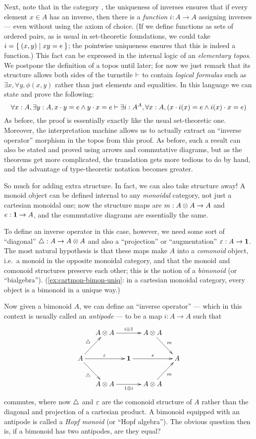 Next, note that in the category \bSet, the uniqueness of inverses ensures that if every element $x\in A$ has an inverse, then there is a \emph{function} $i:A\to A$ assigning inverses --- even without using the axiom of choice.
(If we define functions as sets of ordered pairs, as is usual in set-theoretic foundations, we could take $i = \Set{(x,y) | xy=e}$; the pointwise uniqueness ensures that this is indeed a function.)
This fact can be expressed in the internal logic of an \emph{elementary topos}.
We postpone the definition of a topos until later; for now we just remark that its structure allows both sides of the turnstile $\vdash$ to contain \emph{logical formulas} such as $\exists x, \forall y, \phi(x,y)$ rather than just elements and equalities.
In this language we can state and prove the following:
\[ \forall x:A, \exists y:A, x\cdot y = e \land y\cdot x = e \vdash
\exists i:A^A, \forall x:A, (x\cdot i(x) = e \land i(x)\cdot x = e)
\]
As before, the proof is essentially exactly like the usual set-theoretic one.
Moreover, the interpretation machine allows us to actually extract an ``inverse operator'' morphism in the topos from this proof.
As before, such a result can also be stated and proved using arrows and commutative diagrams, but as the theorems get more complicated, the translation gets more tedious to do by hand, and the advantage of type-theoretic notation becomes greater.

So much for adding extra structure.
In fact, we can also take structure away!
A monoid object can be defined internal to any \emph{monoidal} category, not just a cartesian monoidal one; now the structure maps are $m:A\otimes A\to A$ and $e:\mathbf{1}\to A$, and the commutative diagrams are essentially the same.

To define an inverse operator in this case, however, we need some sort of ``diagonal'' $\triangle:A\to A\otimes A$ and also a ``projection'' or ``augmentation'' $\varepsilon:A\to \mathbf{1}$.
The most natural hypothesis is that these maps make $A$ into a \emph{comonoid} object, i.e.\ a monoid in the opposite monoidal category, and that the monoid and comonoid structures preserve each other; this is the notion of a \emph{bimonoid} (or ``bialgebra'').
(\cref{ex:cartmon-bimon-uniq}: in a cartesian monoidal category, every object is a bimonoid in a unique way.)

Now given a bimonoid $A$, we can define an ``inverse operator'' --- which in this context is usually called an \emph{antipode} --- to be a map $i:A\to A$ such that
\begin{equation}
  \vcenter{\xymatrix@C=1pc{& A\tensor A \ar[rr]^{i\tensor 1} && A\tensor A \ar[dr]^m \\
      A \ar[ur]^{\comult} \ar[dr]_{\comult} \ar[rr]^{\counit} && \one \ar[rr]^{e} && A \\
      & A\tensor A \ar[rr]_{1\tensor i} && A\tensor A \ar[ur]_{m}}}
\end{equation}
commutes, where now $\triangle$ and $\varepsilon$ are the comonoid structure of $A$ rather than the diagonal and projection of a cartesian product.
A bimonoid equipped with an antipode is called a \emph{Hopf monoid} (or ``Hopf algebra'').
The obvious question then is, if a bimonoid has two antipodes, are they equal?


